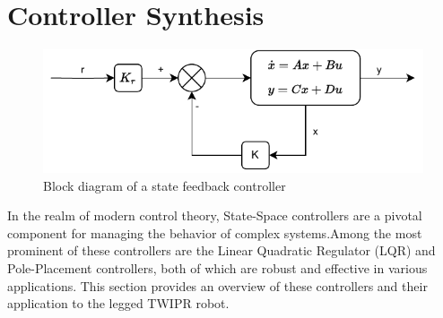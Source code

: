 %
%

\section{Controller Synthesis}

\begin{figure}[h]
	\centering
	\includegraphics[width=.5\textwidth]{Block Diagram of State Feedback Controller}
	\caption{Block diagram of a state feedback controller}
	\label{fig:Block diagram of a state feedback controller}
\end{figure}


In the realm of modern control theory, State-Space controllers are a pivotal component for managing the behavior of complex systems.Among the most prominent of these controllers are the Linear Quadratic Regulator (LQR) and Pole-Placement controllers, both of which are robust and effective in various applications.
This section provides an overview of these controllers and their application to the legged TWIPR robot.

